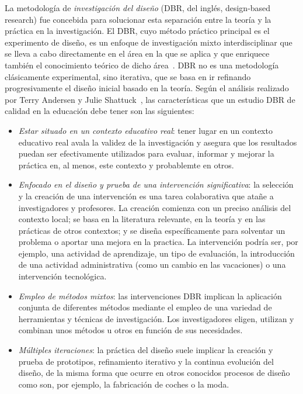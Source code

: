 La metodología de \emph{investigación del diseño} (DBR, del inglés, design-based research) fue concebida para solucionar esta separación entre la teoría y la práctica en la investigación. El DBR, cuyo método práctico principal es el experimento de diseño, es un enfoque de investigación mixto interdisciplinar que se lleva a cabo directamente en el área en la que se aplica y que enriquece también el conocimiento teórico de dicho área~\cite{reimann2011design}. DBR no es una metodología clásicamente experimental, sino iterativa, que se basa en ir refinando progresivamente el diseño inicial basado en la teoría. Según el análisis realizado por Terry Andersen y Julie Shattuck~\cite{anderson2012design}, las características que un estudio DBR de calidad en la educación debe tener son las siguientes:

\begin{itemize}
\item \emph{Estar situado en un contexto educativo real}: tener lugar en un contexto educativo real avala la validez de la investigación y asegura que los resultados puedan ser efectivamente utilizados para evaluar, informar y mejorar la práctica en, al menos, este contexto y probablemte en otros.
\item \emph{Enfocado en el diseño y prueba de una intervención significativa}: la selección y la creación de una intervención es una tarea colaborativa que atañe a investigadores y profesores. La creación comienza con un preciso análisis del contexto local; se basa en la literatura relevante, en la teoría y en las prácticas de otros contextos; y se diseña específicamente para solventar un problema o aportar una mejora en la practica. La intervención podría ser, por ejemplo, una actividad de aprendizaje, un tipo de evaluación, la introducción de una actividad administrativa (como un cambio en las vacaciones) o una intervención tecnológica. %
\item \emph{Empleo de métodos mixtos}: las intervenciones DBR implican la aplicación conjunta de diferentes métodos mediante el empleo de una variedad de herramientas y técnicas de investigación. Los investigadores eligen, utilizan y combinan unos métodos u otros en función de sus necesidades.
\item \emph{Múltiples iteraciones}: la práctica del diseño suele implicar la creación y prueba de prototipos, refinamiento iterativo y la continua evolución del diseño, de la misma forma que ocurre en otros conocidos procesos de diseño como son, por ejemplo, la fabricación de coches o la moda.

\end{itemize}
